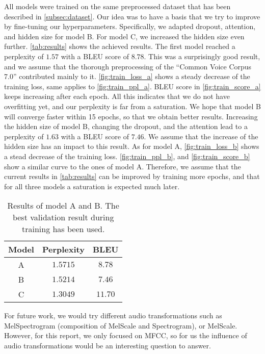 \documentclass[11pt,a4paper]{article}
\begin{document}
All models were trained on the same preprocessed dataset that has been described in \autoref{subsec:dataset}.
Our idea was to have a basis that we try to improve by fine-tuning our hyperparameters.
Specifically, we adapted dropout, attention, and hidden size for model B.
For model C, we increased the hidden size even further.
\autoref{tab:results} shows the achieved results.
The first model reached a perplexity of $1.57$ with a BLEU score of $8.78$.
This was a surprisingly good result, and we assume that the thorough preprocessing of the \enquote{Common Voice Corpus 7.0} contributed mainly to it.
\autoref{fig:train_loss_a} shows a steady decrease of the  training loss, same applies to \autoref{fig:train_ppl_a}.
BLEU score in \autoref{fig:train_score_a} keeps increasing after each epoch.
All this indicates that we do not have overfitting yet, and our perplexity is far from a saturation.
We hope that model B will converge faster within 15 epochs, so that we obtain better results.
Increasing the hidden size of model B, changing the dropout, and the attention lead to a perplexity of $1.63$ with a BLEU score of $7.46$.
We assume that the increase of the hidden size has an impact to this result.
As for model A, \autoref{fig:train_loss_b} shows a stead decrease of the training loss.
\autoref{fig:train_ppl_b}, and \autoref{fig:train_score_b} show a similar curve to the ones of model A.
Therefore, we assume that the current results in \autoref{tab:results} can be improved by training more epochs, and that for all three models a saturation is expected much later.

\begin{table}[ht]
    \centering
    \caption{Results of model A and B. The best validation result during training has been used.}
    \begin{tabular}{c|cc}
        \toprule
        \textbf{Model} & \textbf{Perplexity} & \textbf{BLEU} \\
        \midrule
        A     &  $1.5715$  & $8.78$ \\
        B     &  $1.5214$  & $7.46$ \\
        C     &  $1.3049$  & $11.70$  \\
        \bottomrule
    \end{tabular}
    \label{tab:results}
\end{table}

For future work, we would try different audio transformations such as MelSpectrogram (composition of MelScale and Spectrogram), or MelScale. However, for this report, we only focused on MFCC, so for us the influence of audio transformations would be an interesting question to answer.
\end{document}
